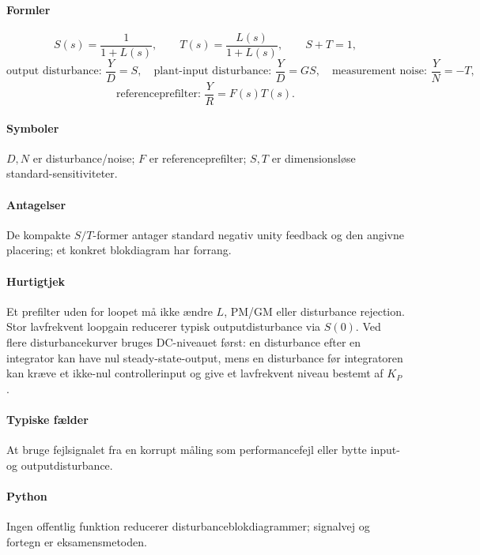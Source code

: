 \paragraph{Formler}
\begin{equation}
\label{eq:sensitivity-functions}
S(s)=\frac1{1+L(s)},\qquad T(s)=\frac{L(s)}{1+L(s)},\qquad S+T=1,
\end{equation}
\begin{equation}
\label{eq:disturbance-standard-paths}
\text{output disturbance: } \frac{Y}{D}=S,\quad
\text{plant-input disturbance: } \frac{Y}{D}=GS,\quad
\text{measurement noise: } \frac{Y}{N}=-T,
\end{equation}
\begin{equation}
\label{eq:reference-prefilter}
\text{referenceprefilter: }\frac{Y}{R}=F(s)T(s).
\end{equation}

\paragraph{Symboler}
\(D,N\) er disturbance/noise; \(F\) er referenceprefilter; \(S,T\) er
dimensionsløse standard-sensitiviteter.

\paragraph{Antagelser}
De kompakte \(S/T\)-former antager standard negativ unity feedback og den angivne
placering; et konkret blokdiagram har forrang.

\paragraph{Hurtigtjek}
Et prefilter uden for loopet må ikke ændre \(L\), PM/GM eller disturbance rejection.
Stor lavfrekvent loopgain reducerer typisk outputdisturbance via \(S(0)\).
Ved flere disturbancekurver bruges DC-niveauet først: en disturbance efter en integrator
kan have nul steady-state-output, mens en disturbance før integratoren kan kræve et
ikke-nul controllerinput og give et lavfrekvent niveau bestemt af \(K_P\).

\paragraph{Typiske fælder}
At bruge fejlsignalet fra en korrupt måling som performancefejl eller bytte input- og
outputdisturbance.

\paragraph{Python}
Ingen offentlig funktion reducerer disturbanceblokdiagrammer; signalvej og fortegn er
eksamensmetoden.

